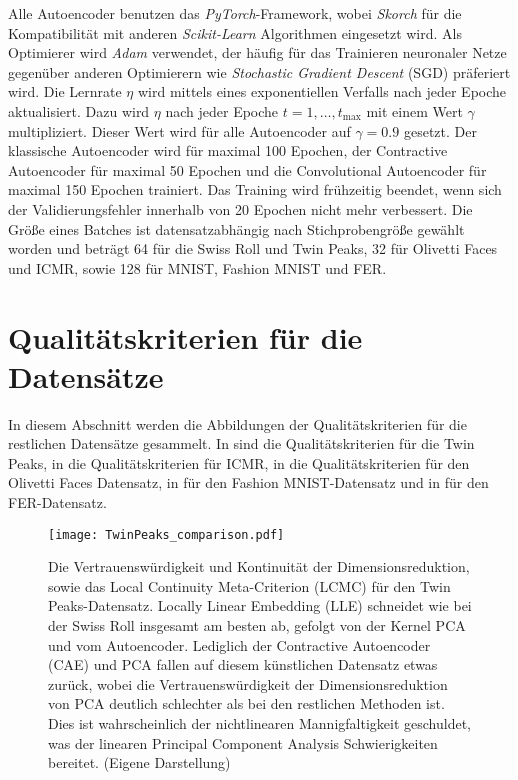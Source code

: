 Alle Autoencoder benutzen das \textit{PyTorch}-Framework, wobei \textit{Skorch} für die
Kompatibilität mit anderen \textit{Scikit-Learn} Algorithmen eingesetzt wird. Als Optimierer wird
\textit{Adam} verwendet, der häufig für das Trainieren neuronaler Netze gegenüber anderen
Optimierern wie \textit{Stochastic Gradient Descent} (SGD) präferiert wird. Die Lernrate $\eta$
wird mittels eines exponentiellen Verfalls nach jeder Epoche aktualisiert. Dazu wird $\eta$ nach
jeder Epoche $t = 1, \ldots, t_{\text{max}}$ mit einem Wert $\gamma$ multipliziert. Dieser Wert
wird für alle Autoencoder auf $\gamma = \num{0,9}$ gesetzt. Der klassische Autoencoder wird für
maximal 100 Epochen, der Contractive Autoencoder für maximal 50 Epochen und die Convolutional
Autoencoder für maximal 150 Epochen trainiert. Das Training wird frühzeitig beendet, wenn sich der
Validierungsfehler innerhalb von 20 Epochen nicht mehr verbessert. Die Größe eines Batches ist
datensatzabhängig nach Stichprobengröße gewählt worden und beträgt 64 für die Swiss Roll und Twin
Peaks, 32 für Olivetti Faces und ICMR, sowie 128 für MNIST, Fashion MNIST und FER.

\section{Qualitätskriterien für die Datensätze}
\label{ch:Appendix:Qualitaetskriterien}

In diesem Abschnitt werden die Abbildungen der Qualitätskriterien für die restlichen Datensätze
gesammelt. In  sind die Qualitätskriterien für die Twin Peaks, in
 die Qualitätskriterien für ICMR, in  die
Qualitätskriterien für den Olivetti Faces Datensatz, in  für den
Fashion MNIST-Datensatz und in  für den FER-Datensatz.
\begin{figure}[ht]
	\begin{center}
		\texttt{[image: TwinPeaks\_comparison.pdf]}
	\end{center}
	\caption[Qualitätskriterien für den Twin Peaks-Datensatz]{Die Vertrauenswürdigkeit und Kontinuität der Dimensionsreduktion, sowie das Local Continuity Meta-Criterion (LCMC) für den Twin Peaks-Datensatz. Locally Linear Embedding (LLE) schneidet wie bei der Swiss Roll insgesamt am besten ab, gefolgt von der Kernel PCA und vom Autoencoder. Lediglich der Contractive Autoencoder (CAE) und PCA fallen auf diesem künstlichen Datensatz etwas zurück, wobei die Vertrauenswürdigkeit der Dimensionsreduktion von PCA deutlich schlechter als bei den restlichen Methoden ist. Dies ist wahrscheinlich der nichtlinearen Mannigfaltigkeit geschuldet, was der linearen Principal Component Analysis Schwierigkeiten bereitet. (Eigene Darstellung)}
	\label{fig:TwinPeaksMetrics}
\end{figure}

